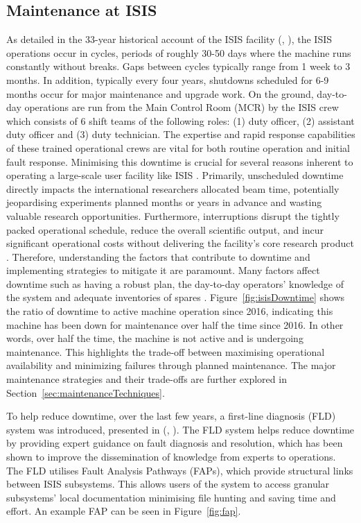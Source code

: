 \documentclass[10pt,oneside]{report}
\renewcommand{\citet}[1]{\citeauthor{#1}, \citeyear{#1}}
\begin{document}
\subsection{Maintenance at ISIS} 
As detailed in the 33-year historical account of the ISIS facility (\citet{thomason2019isis}), the ISIS operations occur in cycles, periods of roughly 30-50 days where the machine runs constantly without breaks. Gaps between cycles typically range from 1 week to 3 months. In addition, typically every four years, shutdowns scheduled for 6-9 months occur for major maintenance and upgrade work. On the ground, day-to-day operations are run from the Main Control Room (MCR) by the ISIS crew which consists of 6 shift teams of the following roles: (1) duty officer, (2) assistant duty officer and (3) duty technician.  The expertise and rapid response capabilities of these trained operational crews are vital for both routine operation and initial fault response.
Minimising this downtime is crucial for several reasons inherent to operating a large-scale user facility like ISIS \cite{thomason2019isis}. Primarily, unscheduled downtime directly impacts the international researchers allocated beam time, potentially jeopardising experiments planned months or years in advance and wasting valuable research opportunities. Furthermore, interruptions disrupt the tightly packed operational schedule, reduce the overall scientific output, and incur significant operational costs without delivering the facility's core research product \cite{thomason2019isis}. Therefore, understanding the factors that contribute to downtime and implementing strategies to mitigate it are paramount.
Many factors affect downtime such as having a robust plan, the day-to-day operators' knowledge of the system and adequate inventories of spares \cite{thomason2019isis}. Figure~\ref{fig:isisDowntime} shows the ratio of downtime to active machine operation since 2016, indicating this machine has been down for maintenance over half the time since 2016. In other words, over half the time, the machine is not active and is undergoing maintenance. This highlights the trade-off between maximising operational availability and minimizing failures through planned maintenance. The major maintenance strategies and their trade-offs are further explored in Section~\ref{sec:maintenanceTechniques}.

To help reduce downtime, over the last few years, a first-line diagnosis (FLD) system was introduced, presented in (\citet{fld2017}). The FLD system helps reduce downtime by providing expert guidance on fault diagnosis and resolution, which has been shown to improve the dissemination of knowledge from experts to operations. The FLD utilises Fault Analysis Pathways (FAPs), which provide structural links between ISIS subsystems. This allows users of the system to access granular subsystems' local documentation minimising file hunting and saving time and effort. An example FAP can be seen in Figure~\ref{fig:fap}.
\end{document}
